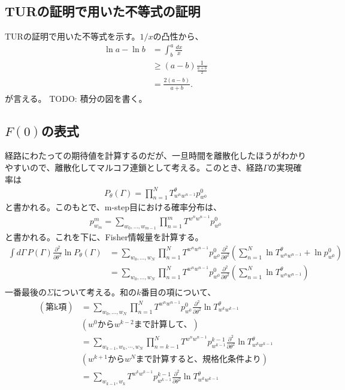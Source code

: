 \documentclass[a4paper,11pt]{jsarticle}
\numberwithin{equation}{section}
\begin{document}
\subsection{TURの証明で用いた不等式の証明}
TURの証明で用いた不等式を示す。$1/x$の凸性から、
\begin{align}
    \ln a - \ln b &= \int_b^a \frac{dx}{x} \\
    &\geq (a - b) \frac{1}{\frac{a + b}{2}} \\
    &= \frac{2(a - b)}{a + b}.
\end{align}
が言える。
TODO: 積分の図を書く。



\subsection{$F(0)$の表式}
経路にわたっての期待値を計算するのだが、一旦時間を離散化したほうがわかりやすいので、離散化してマルコフ連鎖として考える。このとき、経路$\Gamma$の実現確率は
\begin{align}
    P_\theta(\Gamma) = \prod_{n=1}^N T^\theta_{w^n w^{n-1}} p^0_{w^0}
\end{align}
と書かれる。このもとで、m-step目における確率分布は、
\begin{align}
    p^m_{w_m} = \sum_{w_0, \dots, w_{m-1}} \prod_{n=1}^m T^{w^n w^{n-1}} p^0_{w^0}
\end{align}
と書かれる。これを下に、Fisher情報量を計算する。
\begin{align}
    \int d\Gamma \, P(\Gamma) \frac{\partial^2}{\partial \theta^2} \ln P_\theta(\Gamma) 
    &= \sum_{w_0, \dots, w_N} \prod_{n=1}^N T^{w^n w^{n-1}} p^0_{w^0} 
    \frac{\partial^2}{\partial \theta^2} 
    \left(
        \sum_{n=1}^N \ln T^\theta_{w^n w^{n-1}} + \ln p^0_{w^0}
    \right) \\
    &= \sum_{w_0, \dots, w_N} \prod_{n=1}^N T^{w^n w^{n-1}} p^0_{w^0} 
    \frac{\partial^2}{\partial \theta^2} 
    \left(
        \sum_{n=1}^N \ln T^\theta_{w^n w^{n-1}}
    \right) \\
\end{align}
一番最後の$\Sigma$について考える。和の$k$番目の項について、
\begin{align}
    (\text{第k項}) &= \sum_{w_0, \dots, w_N} \prod_{n=1}^N T^{w^n w^{n-1}} p^0_{w^0} \frac{\partial^2}{\partial \theta^2} \ln T^\theta_{w^k w^{k-1}} \\
    &(w^{0}\text{から}w^{k-2}\text{まで計算して、}) \nonumber \\
    &= \sum_{w_{k-1}, w_k,\cdots, w_N} \prod_{n=k-1}^N T^{w^n w^{n-1}} p^{k-1}_{w^{k-1}}\frac{\partial^2}{\partial \theta^2} \ln T^\theta_{w^k w^{k-1}} \\
    &(w^{k+1}\text{から}w^{N}\text{まで計算すると、規格化条件より}) \nonumber \\
    &= \sum_{w_{k-1}, w_k} T^{w^k w^{k-1}} p^{k-1}_{w^{k-1}}\frac{\partial^2}{\partial \theta^2} \ln T^\theta_{w^k w^{k-1}} 
\end{align}
\end{document}
